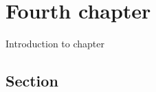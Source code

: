 \chapter{Fourth chapter}
\label{chap:fourth-chapter}
Introduction to chapter

\section{Section}
\label{sec:fourth-section}

\newpage